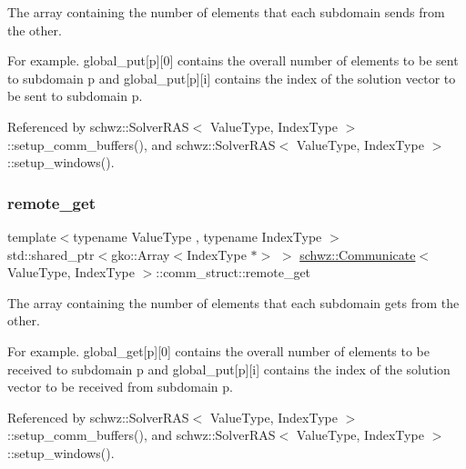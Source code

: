 The array containing the number of elements that each subdomain sends from the other. 

For example. global\+\_\+put\mbox{[}p\mbox{]}\mbox{[}0\mbox{]} contains the overall number of elements to be sent to subdomain p and global\+\_\+put\mbox{[}p\mbox{]}\mbox{[}i\mbox{]} contains the index of the solution vector to be sent to subdomain p. 

Referenced by schwz\+::\+Solver\+R\+A\+S$<$ Value\+Type, Index\+Type $>$\+::setup\+\_\+comm\+\_\+buffers(), and schwz\+::\+Solver\+R\+A\+S$<$ Value\+Type, Index\+Type $>$\+::setup\+\_\+windows().

\mbox{\label{structschwz_1_1Communicate_1_1comm__struct_a39335cd2ee211817d66189fa6bff7d04}} 
\subsubsection{\texorpdfstring{remote\+\_\+get}{remote\_get}}
{\footnotesize\ttfamily template$<$typename Value\+Type , typename Index\+Type $>$ \\
std\+::shared\+\_\+ptr$<$gko\+::\+Array$<$Index\+Type $\ast$$>$ $>$ \hyperlink{classschwz_1_1Communicate}{schwz\+::\+Communicate}$<$ Value\+Type, Index\+Type $>$\+::comm\+\_\+struct\+::remote\+\_\+get}



The array containing the number of elements that each subdomain gets from the other. 

For example. global\+\_\+get\mbox{[}p\mbox{]}\mbox{[}0\mbox{]} contains the overall number of elements to be received to subdomain p and global\+\_\+put\mbox{[}p\mbox{]}\mbox{[}i\mbox{]} contains the index of the solution vector to be received from subdomain p. 

Referenced by schwz\+::\+Solver\+R\+A\+S$<$ Value\+Type, Index\+Type $>$\+::setup\+\_\+comm\+\_\+buffers(), and schwz\+::\+Solver\+R\+A\+S$<$ Value\+Type, Index\+Type $>$\+::setup\+\_\+windows().

\mbox{\label{structschwz_1_1Communicate_1_1comm__struct_a977cf8a2800021a50e59ee5cefb2a0ca}} 
